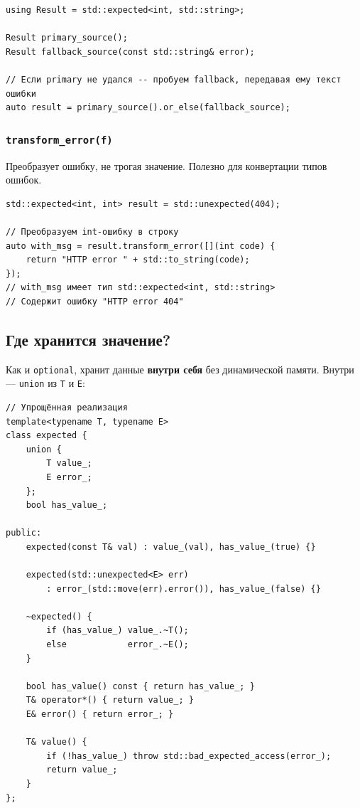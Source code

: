 \documentclass[a4paper,12pt]{article}
\begin{document}
\begin{lstlisting}
using Result = std::expected<int, std::string>;

Result primary_source();
Result fallback_source(const std::string& error);

// Если primary не удался -- пробуем fallback, передавая ему текст ошибки
auto result = primary_source().or_else(fallback_source);
\end{lstlisting}

\subsubsection{\texttt{transform\_error(f)}}

Преобразует ошибку, не трогая значение. Полезно для конвертации типов ошибок.

\begin{lstlisting}
std::expected<int, int> result = std::unexpected(404);

// Преобразуем int-ошибку в строку
auto with_msg = result.transform_error([](int code) {
    return "HTTP error " + std::to_string(code);
});
// with_msg имеет тип std::expected<int, std::string>
// Содержит ошибку "HTTP error 404"
\end{lstlisting}

\subsection{Где хранится значение?}

Как и \texttt{optional}, хранит данные \textbf{внутри себя} без динамической
памяти. Внутри --- \texttt{union} из \texttt{T} и \texttt{E}:

\begin{lstlisting}
// Упрощённая реализация
template<typename T, typename E>
class expected {
    union {
        T value_;
        E error_;
    };
    bool has_value_;

public:
    expected(const T& val) : value_(val), has_value_(true) {}

    expected(std::unexpected<E> err)
        : error_(std::move(err).error()), has_value_(false) {}

    ~expected() {
        if (has_value_) value_.~T();
        else            error_.~E();
    }

    bool has_value() const { return has_value_; }
    T& operator*() { return value_; }
    E& error() { return error_; }

    T& value() {
        if (!has_value_) throw std::bad_expected_access(error_);
        return value_;
    }
};
\end{lstlisting}
\end{document}
